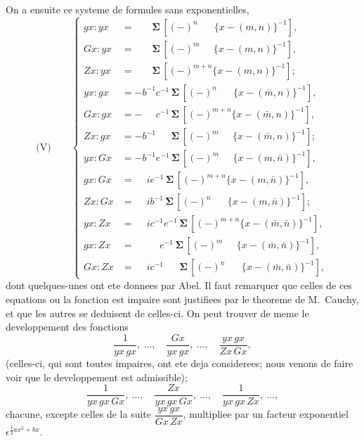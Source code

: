 \documentclass[11pt,a4paper]{book}
\begin{document}
On a ensuite ce systeme de formules sans exponentielles,
\begin{equation*}
\text{(V)}\qquad
\left\{
\begin{aligned}
gx : yx &= \phantom{ie^{-1}}\boldsymbol{\Sigma}\, [(-)^n \phantom{+m}\{x - (m, n)\}^{-1}],\\
Gx : yx &= \phantom{ie^{-1}}\boldsymbol{\Sigma}\, [(-)^m \phantom{+n}\{x - (m, n)\}^{-1}],\\
Zx : yx &= \phantom{ie^{-1}}\boldsymbol{\Sigma}\, [(-)^{m+n} \{x - (m, n)\}^{-1}];\\
yx : gx &= -b^{-1} c^{-1}\, \boldsymbol{\Sigma}\, [(-)^n \phantom{+m}\{x - (\bar{m}, n)\}^{-1}],\\
Gx : gx &= -\phantom{b^{-1}} c^{-1}\, \boldsymbol{\Sigma}\, [(-)^{m+n} \{x - (\bar{m}, n)\}^{-1}],\\
Zx : gx &= -b^{-1} \phantom{c^{-1}}\, \boldsymbol{\Sigma}\, [(-)^m \phantom{+n}\{x - (\bar{m}, n)\}^{-1}];\\
yx : Gx &= -b^{-1} e^{-1}\, \boldsymbol{\Sigma}\, [(-)^m \phantom{+n}\{x - (m, \bar{n})\}^{-1}],\\
gx : Gx &= \phantom{-}ie^{-1}\, \boldsymbol{\Sigma}\, [(-)^{m+n} \{x - (m, \bar{n})\}^{-1}],\\
Zx : Gx &= \phantom{-}ib^{-1}\, \boldsymbol{\Sigma}\, [(-)^n \phantom{+m}\{x - (m, \bar{n})\}^{-1}];\\
yx : Zx &= \phantom{-}ic^{-1} e^{-1}\, \boldsymbol{\Sigma}\, [(-)^{m+n} \{x - (\bar{m}, \bar{n})\}^{-1}],\\
gx : Zx &= \phantom{-ie^{-1}} e^{-1}\, \boldsymbol{\Sigma}\, [(-)^m \phantom{+n}\{x - (\bar{m}, \bar{n})\}^{-1}],\\
Gx : Zx &= \phantom{-}ic^{-1} \phantom{e^{-1}}\, \boldsymbol{\Sigma}\, [(-)^n \phantom{+m}\{x - (\bar{m}, \bar{n})\}^{-1}],
\end{aligned}
\right.
\end{equation*}
dont quelques-unes ont ete donnees par Abel. Il faut remarquer que celles de ces
equations ou la fonction est impaire sont justifiees par le theoreme de M.~Cauchy, et
que les autres se deduisent de celles-ci. On peut trouver de meme le developpement
des fonctions
\[\frac{1}{yx\, gx},\ \ldots,\quad \frac{Gx}{yx\, gx},\ \ldots,\quad \frac{yx\, gx}{Zx\, Gx},\]
(celles-ci, qui sont toutes impaires, ont ete deja considerees; nous venons de faire voir
que le developpement est admissible);
\[\frac{1}{yx\, gx\, Gx},\ \ldots,\quad \frac{Zx}{yx\, gx\, Gx},\ \ldots,\quad \frac{1}{yx\, gx\, Zx},\ \ldots,\]
chacune, excepte celles de la suite $\dfrac{yx\, gx}{Gx\, Zx}$, multipliee par un facteur exponentiel
$\epsilon^{\frac{1}{2}ax^2+bx}$.
\end{document}
